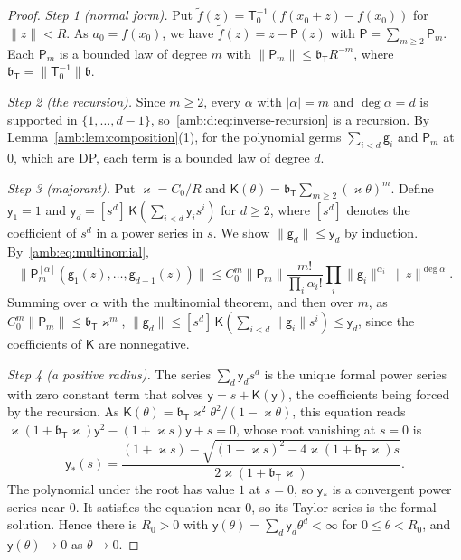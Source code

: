 \documentclass[11pt]{amsart}
\theoremstyle{definition}
\theoremstyle{remark}
\numberwithin{equation}{section}
\newcommand{\abs}[1]{\lvert #1\rvert}
\newcommand{\norm}[1]{\lVert #1\rVert}
\theoremstyle{plain}
\theoremstyle{definition}
\theoremstyle{plain}
\begin{document}
\begin{proof}
\emph{Step 1 (normal form).} Put $\tilde f(z)=\mathsf T_0^{-1}(f(x_0+z)-f(x_0))$ for $\norm z<R$. As $a_0=f(x_0)$, we have
$\tilde f(z)=z-\mathsf P(z)$ with $\mathsf P=\sum_{m\ge2}\mathsf P_m$. Each $\mathsf P_m$ is a bounded law of degree $m$ with
$\norm{\mathsf P_m}\le \mathfrak b_{\mathsf T}R^{-m}$, where $\mathfrak b_{\mathsf T}=\norm{\mathsf T_0^{-1}}\mathfrak b$.

\emph{Step 2 (the recursion).} Since $m\ge2$, every $\alpha$ with $\abs\alpha=m$ and $\deg\alpha=d$ is supported in
$\{1,\dots,d-1\}$, so~\eqref{amb:d:eq:inverse-recursion} is a recursion. By Lemma~\ref{amb:lem:composition}(1), for the polynomial germs $\sum_{i<d}\mathsf g_i$ and $\mathsf P_m$ at $0$,
which are DP, each term is a bounded law of degree $d$.

\emph{Step 3 (majorant).} Put $\varkappa=C_0/R$ and $\mathsf K(\theta)=\mathfrak b_{\mathsf T}\sum_{m\ge2}(\varkappa\theta)^m$. Define $\mathsf y_1=1$ and
$\mathsf y_d=[s^d]\,\mathsf K(\sum_{i<d}\mathsf y_is^i)$ for $d\ge2$, where $[s^d]$ denotes the coefficient of $s^d$ in a power series in $s$. We show $\norm{\mathsf g_d}\le\mathsf y_d$ by induction. By~\eqref{amb:eq:multinomial},
\[
 \bigl\lVert\mathsf P_m^{[\alpha]}(\mathsf g_1(z),\dots,\mathsf g_{d-1}(z))\bigr\rVert
 \le C_0^m\norm{\mathsf P_m}\frac{m!}{\prod_i\alpha_i!}\prod_i\norm{\mathsf g_i}^{\alpha_i}\ \norm z^{\deg\alpha}.
\]
Summing over $\alpha$ with the multinomial theorem, and then over $m$, as $C_0^m\norm{\mathsf P_m}\le \mathfrak b_{\mathsf T}\varkappa^m$,
$\norm{\mathsf g_d}\le[s^d]\,\mathsf K(\sum_{i<d}\norm{\mathsf g_i}s^i)\le\mathsf y_d$, since the coefficients of $\mathsf K$ are
nonnegative.

\emph{Step 4 (a positive radius).} The series $\sum_d\mathsf y_ds^d$ is the unique formal power series with zero constant term that solves
$\mathsf y=s+\mathsf K(\mathsf y)$, the coefficients being forced by the recursion. As $\mathsf K(\theta)=\mathfrak b_{\mathsf T}\varkappa^2\theta^2/(1-\varkappa\theta)$, this equation
reads $\varkappa(1+\mathfrak b_{\mathsf T}\varkappa)\mathsf y^2-(1+\varkappa s)\mathsf y+s=0$, whose root vanishing at $s=0$ is
\[
 \mathsf y_*(s)=\frac{(1+\varkappa s)-\sqrt{(1+\varkappa s)^2-4\varkappa(1+\mathfrak b_{\mathsf T}\varkappa)s}}{2\varkappa(1+\mathfrak b_{\mathsf T}\varkappa)}.
\]
The polynomial under the root has value $1$ at $s=0$, so $\mathsf y_*$ is a convergent power series near $0$. It satisfies the
equation near $0$, so its Taylor series is the formal solution. Hence there is $R_0>0$ with
$\mathsf y(\theta)=\sum_d\mathsf y_d\theta^d<\infty$ for $0\le\theta<R_0$, and $\mathsf y(\theta)\to0$ as $\theta\to0$.


\end{proof}
\end{document}
